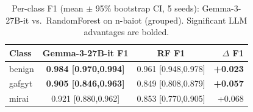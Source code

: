 \begin{table}[t]
\caption{Per-class F1 (mean $\pm$ 95\% bootstrap CI, 5 seeds): Gemma-3-27B-it vs.\ RandomForest on n-baiot (grouped). Significant LLM advantages are bolded.}
\label{t:r2_perclass}
\begin{tabular}{lccr}
\hline
Class & Gemma-3-27B-it F1 & RF F1 & $\Delta$ F1 \\
\hline
benign & \textbf{0.984 [0.970,0.994]} & 0.961 [0.948,0.978] & \textbf{+0.023} \\
gafgyt & \textbf{0.905 [0.846,0.963]} & 0.849 [0.808,0.879] & \textbf{+0.057} \\
mirai & 0.921 [0.880,0.962] & 0.853 [0.770,0.905] & +0.068 \\
\hline
\end{tabular}
\end{table}
